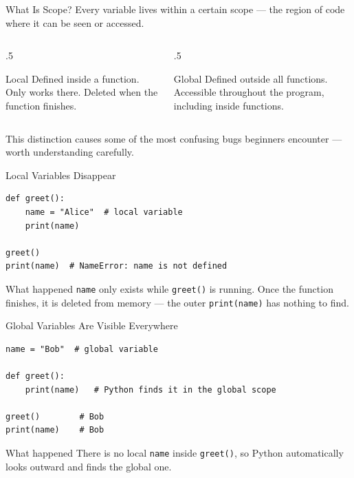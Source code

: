 \documentclass[9pt,aspectratio=169,xcolor=table]{beamer}
\begin{document}
\begin{frame}{What Is Scope?}
    \leavevmode
    Every variable lives within a certain \alert{scope} --- the region
    of code where it can be seen or accessed.

    \vspace{3mm}
    \begin{columns}[t]
        \begin{column}{.5\textwidth}
            \begin{block}{Local}
                \small Defined inside a function. Only works there.
                Deleted when the function finishes.
            \end{block}
        \end{column}
        \begin{column}{.5\textwidth}
            \begin{block}{Global}
                \small Defined outside all functions. Accessible
                throughout the program, including inside functions.
            \end{block}
        \end{column}
    \end{columns}

    \vspace{3mm}
    {\small This distinction causes some of the most confusing bugs
    beginners encounter --- worth understanding carefully.}
\end{frame}

\begin{frame}[fragile]{Local Variables Disappear}
    \leavevmode
\begin{lstlisting}
def greet():
    name = "Alice"  # local variable
    print(name)

greet()
print(name)  # NameError: name is not defined
\end{lstlisting}

    \vspace{2mm}
    \begin{alertblock}{What happened}
        \texttt{name} only exists while \texttt{greet()} is running.
        Once the function finishes, it is \alert{deleted from memory}
        --- the outer \texttt{print(name)} has nothing to find.
    \end{alertblock}
\end{frame}

\begin{frame}[fragile]{Global Variables Are Visible Everywhere}
    \leavevmode
\begin{lstlisting}
name = "Bob"  # global variable

def greet():
    print(name)   # Python finds it in the global scope

greet()        # Bob
print(name)    # Bob
\end{lstlisting}

    \vspace{2mm}
    \begin{block}{What happened}
        There is no local \texttt{name} inside \texttt{greet()}, so
        Python automatically looks outward and finds the global one.
    \end{block}
\end{frame}
\end{document}
